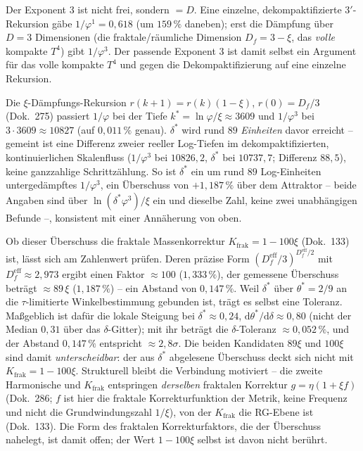 Der Exponent $3$ ist nicht frei, sondern $=D$. Eine einzelne, dekompaktifizierte
$3'$-Rekursion gäbe $1/\varphi^1=0{,}618$ (um $159\,\%$ daneben); erst die Dämpfung über
$D=3$ Dimensionen (die fraktale/räumliche Dimension $D_f=3-\xi$, das \emph{volle} kompakte
$T^4$) gibt $1/\varphi^3$. Der passende Exponent $3$ ist damit selbst ein Argument für das
volle kompakte $T^4$ und gegen die Dekompaktifizierung auf eine einzelne Rekursion.

Die $\xi$-Dämpfungs-Rekursion $r(k{+}1)=r(k)(1-\xi)$, $r(0)=D_f/3$ (Dok.~275) passiert
$1/\varphi$ bei der Tiefe $k^*=\ln\varphi/\xi\approx3609$ und $1/\varphi^3$ bei $3\cdot3609
\approx10827$ (auf $0{,}011\,\%$ genau). $\delta^*$ wird rund $89$ \emph{Einheiten} davor
erreicht -- gemeint ist eine Differenz zweier reeller Log-Tiefen im dekompaktifizierten,
kontinuierlichen Skalenfluss ($1/\varphi^3$ bei $10826{,}2$, $\delta^*$ bei $10737{,}7$;
Differenz $88{,}5$), keine ganzzahlige Schrittzählung. So ist $\delta^*$ ein um rund $89$
Log-Einheiten untergedämpftes $1/\varphi^3$, ein Überschuss von $+1{,}187\,\%$ über dem
Attraktor -- beide Angaben sind über $\ln(\delta^*\varphi^{3})/\xi$ ein und dieselbe Zahl,
keine zwei unabhängigen Befunde --, konsistent mit einer Annäherung von oben.

Ob dieser Überschuss die fraktale Massenkorrektur $K_{\text{frak}}=1-100\xi$ (Dok.~133) ist,
lässt sich am Zahlenwert prüfen. Deren präzise Form
$(D_f^{\text{eff}}/3)^{D_f^{\text{eff}}/2}$ mit $D_f^{\text{eff}}\approx2{,}973$ ergibt einen Faktor
$\approx100$ ($1{,}333\,\%$), der gemessene Überschuss beträgt $\approx89\,\xi$ ($1{,}187\,\%$) --
ein Abstand von $0{,}147\,\%$. Weil $\delta^*$ über $\theta^*=2/9$ an die $\tau$-limitierte
Winkelbestimmung gebunden ist, trägt es selbst eine Toleranz. Maßgeblich ist dafür die lokale
Steigung bei $\delta^*\approx0{,}24$, $\mathrm{d}\theta^*/\mathrm{d}\delta\approx0{,}80$ (nicht der
Median $0{,}31$ über das $\delta$-Gitter); mit ihr beträgt die $\delta$-Toleranz
$\approx0{,}052\,\%$, und der Abstand $0{,}147\,\%$ entspricht $\approx2{,}8\sigma$. Die beiden
Kandidaten $89\xi$ und $100\xi$ sind damit \emph{unterscheidbar}: der aus $\delta^*$ abgelesene
Überschuss deckt sich nicht mit $K_{\text{frak}}=1-100\xi$. Strukturell bleibt die Verbindung
motiviert -- die zweite Harmonische und $K_{\text{frak}}$ entspringen \emph{derselben} fraktalen
Korrektur $g=\eta(1+\xi f)$ (Dok.~286; $f$ ist hier die fraktale Korrekturfunktion der Metrik, keine
Frequenz und nicht die Grundwindungszahl $1/\xi$), von der $K_{\text{frak}}$ die RG-Ebene ist
(Dok.~133). Die Form des fraktalen Korrekturfaktors, die der Überschuss nahelegt, ist damit offen;
der Wert $1-100\xi$ selbst ist davon nicht berührt.

